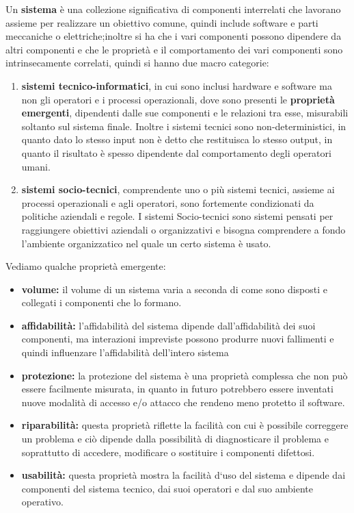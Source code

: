 \documentclass[a4paper,12pt, oneside]{book}
\begin{document}
Un \textbf{sistema} è una collezione significativa di componenti interrelati che lavorano assieme per realizzare
un obiettivo comune, quindi include software e parti meccaniche o elettriche;inoltre si ha che i vari
componenti possono dipendere da altri componenti e che le proprietà e il comportamento dei vari componenti
sono intrinsecamente correlati, quindi si hanno due macro categorie:
\begin{enumerate}
	\item \textbf{sistemi tecnico-informatici}, in cui sono inclusi hardware e software ma non gli operatori e i
	      processi operazionali, dove sono presenti le \textbf{proprietà emergenti}, dipendenti dalle sue componenti
	      e le relazioni tra esse, misurabili soltanto sul sistema finale.\newline
	      Inoltre i sistemi tecnici sono non-deterministici, in quanto dato lo stesso input non è detto che restituisca
	      lo stesso output, in quanto il risultato è spesso dipendente dal comportamento degli operatori umani.
	\item \textbf{sistemi socio-tecnici}, comprendente uno o più sistemi tecnici, assieme ai processi operazionali
	      e agli operatori, sono fortemente condizionati da politiche aziendali e regole.\newline
	      I sistemi Socio-tecnici sono sistemi pensati per raggiungere obiettivi aziendali o organizzativi
	      e bisogna comprendere a fondo l'ambiente organizzatico nel quale un certo sistema è usato.
\end{enumerate}
Vediamo qualche proprietà emergente:
\begin{itemize}
    \item \textbf{volume:} il volume di un sistema varia a seconda di come sono disposti
        e collegati i componenti che lo formano.
    \item \textbf{affidabilità:} l'affidabilità del sistema dipende dall'affidabilità dei suoi componenti,
        ma interazioni impreviste possono produrre nuovi fallimenti 
        e quindi influenzare l'affidabilità dell'intero sistema
    \item \textbf{protezione:} la protezione del sistema è una proprietà complessa 
        che non può essere facilmente misurata, in quanto in futuro potrebbero essere inventati
        nuove modalità di accesso e/o attacco che rendeno meno protetto il software.
    \item \textbf{riparabilità:} questa proprietà riflette la facilità con cui è possibile
        correggere un problema e ciò dipende dalla possibilità di diagnosticare il problema
        e soprattutto di accedere, modificare o sostituire i componenti difettosi.
    \item \textbf{usabilità:} questa proprietà mostra la facilità d‘uso del sistema e dipende dai componenti del
            sistema tecnico, dai suoi operatori e dal suo ambiente operativo.
\end{itemize}
\end{document}
